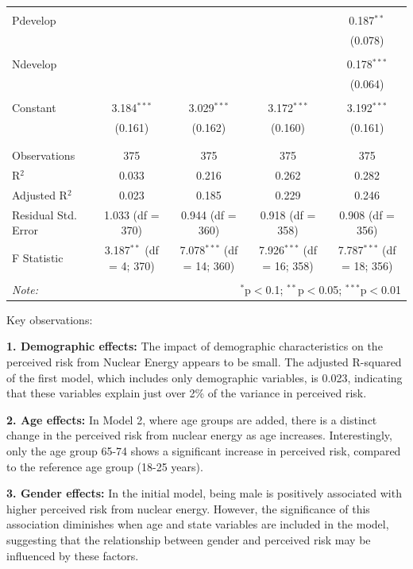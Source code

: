 \documentclass[
]{article}
\begin{document}
\begin{table}[!htbp]
\begin{tabular}{@{\extracolsep{5pt}}lcccc}
  & & & & \\ 
 Pdevelop &  &  &  & 0.187$^{**}$ \\ 
  &  &  &  & (0.078) \\ 
  & & & & \\ 
 Ndevelop &  &  &  & 0.178$^{***}$ \\ 
  &  &  &  & (0.064) \\ 
  & & & & \\ 
 Constant & 3.184$^{***}$ & 3.029$^{***}$ & 3.172$^{***}$ & 3.192$^{***}$ \\ 
  & (0.161) & (0.162) & (0.160) & (0.161) \\ 
  & & & & \\ 
\hline \\[-1.8ex] 
Observations & 375 & 375 & 375 & 375 \\ 
R$^{2}$ & 0.033 & 0.216 & 0.262 & 0.282 \\ 
Adjusted R$^{2}$ & 0.023 & 0.185 & 0.229 & 0.246 \\ 
Residual Std. Error & 1.033 (df = 370) & 0.944 (df = 360) & 0.918 (df = 358) & 0.908 (df = 356) \\ 
F Statistic & 3.187$^{**}$ (df = 4; 370) & 7.078$^{***}$ (df = 14; 360) & 7.926$^{***}$ (df = 16; 358) & 7.787$^{***}$ (df = 18; 356) \\ 
\hline 
\hline \\[-1.8ex] 
\textit{Note:}  & \multicolumn{4}{r}{$^{*}$p$<$0.1; $^{**}$p$<$0.05; $^{***}$p$<$0.01} \\ 
\end{tabular} 
\end{table} 
\endgroup

Key observations:

\textbf{1. Demographic effects:} The impact of demographic
characteristics on the perceived risk from Nuclear Energy appears to be
small. The adjusted R-squared of the first model, which includes only
demographic variables, is 0.023, indicating that these variables explain
just over 2\% of the variance in perceived risk.

\textbf{2. Age effects:} In Model 2, where age groups are added, there
is a distinct change in the perceived risk from nuclear energy as age
increases. Interestingly, only the age group 65-74 shows a significant
increase in perceived risk, compared to the reference age group (18-25
years).

\textbf{3. Gender effects:} In the initial model, being male is
positively associated with higher perceived risk from nuclear energy.
However, the significance of this association diminishes when age and
state variables are included in the model, suggesting that the
relationship between gender and perceived risk may be influenced by
these factors.
\end{document}
